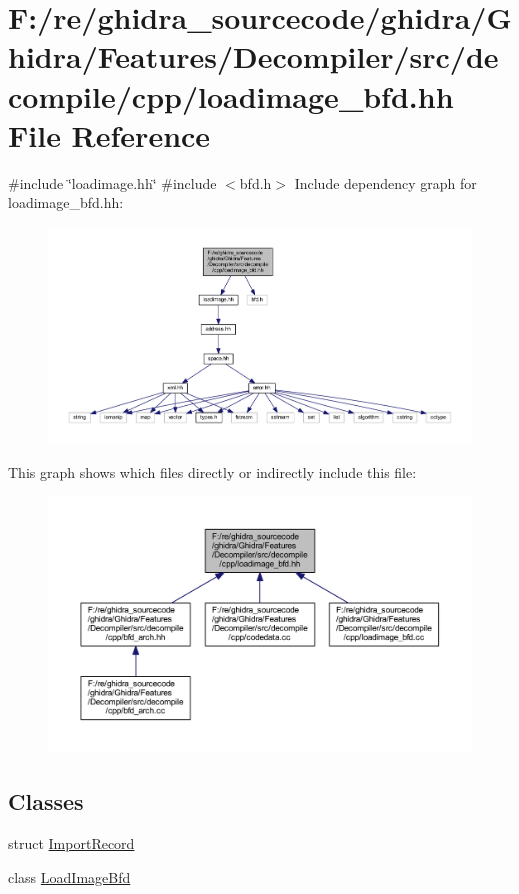 \hypertarget{loadimage__bfd_8hh}{}\section{F\+:/re/ghidra\+\_\+sourcecode/ghidra/\+Ghidra/\+Features/\+Decompiler/src/decompile/cpp/loadimage\+\_\+bfd.hh File Reference}
\label{loadimage__bfd_8hh}
{\ttfamily \#include \char`\"{}loadimage.\+hh\char`\"{}}\newline
{\ttfamily \#include $<$bfd.\+h$>$}\newline
Include dependency graph for loadimage\+\_\+bfd.\+hh\+:
\nopagebreak
\begin{figure}[H]
\begin{center}
\leavevmode
\includegraphics[width=350pt]{loadimage__bfd_8hh__incl}
\end{center}
\end{figure}
This graph shows which files directly or indirectly include this file\+:
\nopagebreak
\begin{figure}[H]
\begin{center}
\leavevmode
\includegraphics[width=350pt]{loadimage__bfd_8hh__dep__incl}
\end{center}
\end{figure}
\subsection*{Classes}
\begin{DoxyCompactItemize}
\item 
struct \mbox{\hyperlink{struct_import_record}{Import\+Record}}
\item 
class \mbox{\hyperlink{class_load_image_bfd}{Load\+Image\+Bfd}}
\end{DoxyCompactItemize}
